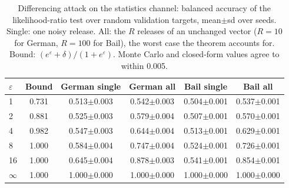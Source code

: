 \begin{table}[t]
\centering
\footnotesize
\caption{Differencing attack on the statistics channel: balanced accuracy of the likelihood-ratio test over random validation targets, mean$\pm$sd over seeds. Single: one noisy release. All: the $R$ releases of an unchanged vector ($R=10$ for German, $R=100$ for Bail), the worst case the theorem accounts for. Bound: $(e^{\varepsilon}+\delta)/(1+e^{\varepsilon})$. Monte Carlo and closed-form values agree to within 0.005.}
\label{tab:privacy_attack}
\begin{tabular}{lccccc}
\toprule
$\varepsilon$ & Bound & German single & German all & Bail single & Bail all \\
\midrule
1 & 0.731 & 0.513$\pm$0.003 & 0.542$\pm$0.003 & 0.504$\pm$0.001 & 0.537$\pm$0.001 \\
2 & 0.881 & 0.525$\pm$0.003 & 0.579$\pm$0.004 & 0.507$\pm$0.001 & 0.570$\pm$0.001 \\
4 & 0.982 & 0.547$\pm$0.003 & 0.644$\pm$0.004 & 0.513$\pm$0.001 & 0.629$\pm$0.001 \\
8 & 1.000 & 0.584$\pm$0.004 & 0.747$\pm$0.004 & 0.524$\pm$0.001 & 0.726$\pm$0.001 \\
16 & 1.000 & 0.645$\pm$0.004 & 0.878$\pm$0.003 & 0.541$\pm$0.001 & 0.854$\pm$0.001 \\
$\infty$ & 1.000 & 1.000$\pm$0.000 & 1.000$\pm$0.000 & 1.000$\pm$0.000 & 1.000$\pm$0.000 \\
\bottomrule
\end{tabular}
\end{table}
